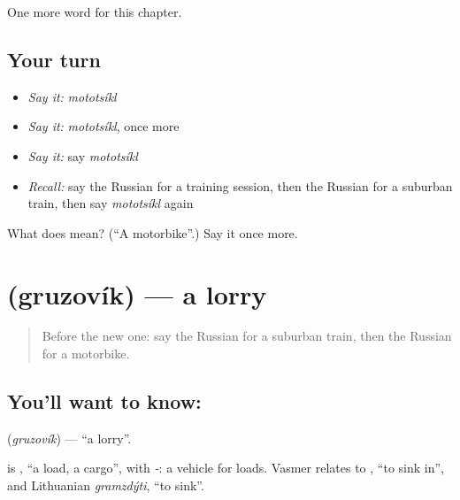 \begin{grammarlens}[title={What you've built}]
One more word for this chapter.
\end{grammarlens}

\subsection*{Your turn}
\begin{itemize}
\raggedright
  \item \emph{Say it:} \emph{mototsíkl}
  \item \emph{Say it:} \emph{mototsíkl}, once more
  \item \emph{Say it:} say \emph{mototsíkl}
  \item \emph{Recall:} say the Russian for a training session, then the Russian for a suburban train, then say \emph{mototsíkl} again
\end{itemize}

\begin{tcolorbox}[breakable,colback=teal!4,colframe=teal!35!black,title={Before you move on}]
What does  mean? (\textquotedblleft{}A motorbike\textquotedblright{}.) Say it once more.
\end{tcolorbox}
\section[\texorpdfstring{\ru{грузовик} (gruzovík)}{грузовик (gruzovík)}]{ (gruzovík) — a lorry}

\label{lesson:RU-C167-gruzovik}



\begin{quote}
Before the new one: say the Russian for a suburban train, then the Russian for a motorbike.
\end{quote}

\subsection*{You'll want to know: }
\textbf{} (\emph{gruzovík}) — \textquotedblleft{}a lorry\textquotedblright{}.

\begin{cousinweb}
\textbf{} is \emph{}, \textquotedblleft{}a load, a cargo\textquotedblright{}, with \emph{-}: a vehicle for loads. Vasmer relates \emph{} to \emph{}, \textquotedblleft{}to sink in\textquotedblright{}, and Lithuanian \emph{gramzdýti}, \textquotedblleft{}to sink\textquotedblright{}.
\end{cousinweb}

